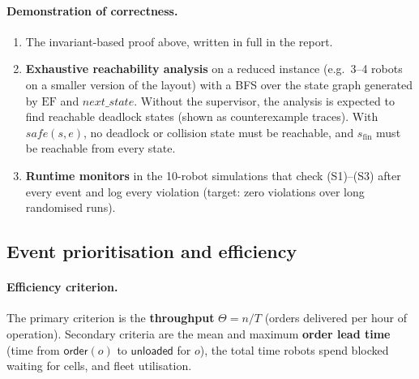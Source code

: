 \documentclass[11pt,a4paper]{article}
\newcommand{\ev}[1]{\mathsf{#1}}            %
\newcommand{\EF}{\mathrm{EF}}
\begin{document}
\paragraph{Demonstration of correctness.}
\begin{enumerate}[leftmargin=*]
  \item The invariant-based proof above, written in full in the report.
  \item \textbf{Exhaustive reachability analysis} on a reduced instance
        (e.g.\ 3--4 robots on a smaller version of the layout) with a BFS over
        the state graph generated by $\EF$ and $\mathit{next\_state}$.
        Without the supervisor, the analysis is expected to find reachable
        deadlock states (shown as counterexample traces). With
        $\mathit{safe}(s,e)$, no deadlock or collision state must be
        reachable, and $s_{\mathrm{fin}}$ must be reachable from every state.
  \item \textbf{Runtime monitors} in the 10-robot simulations that check
        (S1)--(S3) after every event and log every violation (target: zero
        violations over long randomised runs).
\end{enumerate}

\subsection{Event prioritisation and efficiency}\label{sec:priority}

\paragraph{Efficiency criterion.} The primary criterion is the
\textbf{throughput} $\Theta = n/T$ (orders delivered per hour of operation).
Secondary criteria are the mean and maximum \textbf{order lead time} (time
from $\ev{order}(o)$ to $\ev{unloaded}$ for $o$), the total time robots spend
blocked waiting for cells, and fleet utilisation.
\end{document}

